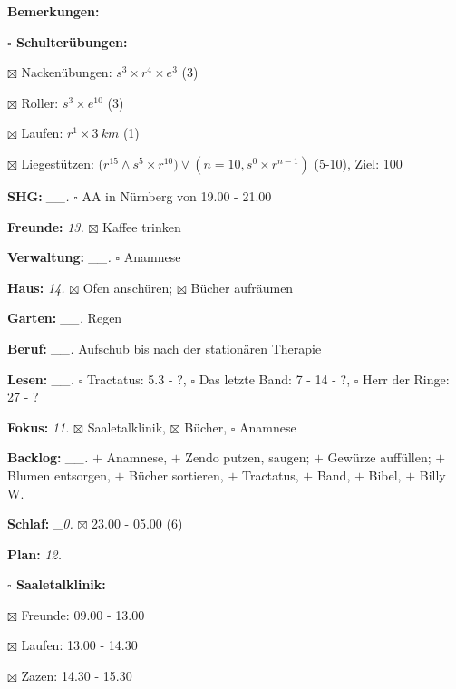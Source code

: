 \documentclass[10pt,a4paper]{article}
\newcommand\prop[1] {{\color {alizarin} {\bf #1}}}        %
\newcommand\mand[1] {{\color {burntorange} {\bf #1}}}     %
\newcommand\topspace{\vskip -15pt \hskip 20pt}
\newcommand\bottomspace{\vskip 4pt}
\newcommand\n[1] { {\sl #1.} \hskip 5pt }
\begin{document}
\begin{mdframed}[style=daystyle]
\begin{labeling}{{\mand {Bemerkungen:}}}
\begin{minipage}{0.75\textwidth}
\begin{labeling}{\prop {$\square$ {Schulterübungen:}}}
      \item[$\boxtimes$ Nackenübungen:]   $s^3 \times r^4 \times e^3$ (3)
      \item[$\boxtimes$ Roller:]          $s^3 \times e^{10}$ (3)
      \item[$\boxtimes$ Laufen:]          $r^1 \times 3\ km$ (1)
      \item[$\boxtimes$ Liegestützen:]    ($r^{15} \land s^5 \times r^{10}) \vee (n=10, s^0 \times r^{n-1})$ (5-10), Ziel: 100
      \end{labeling}
    \end{minipage}
    \bottomspace        
  \item[{\mand {SHG:}}]          \n{\_\_} $\square$ AA in Nürnberg von 19.00 - 21.00
  \item[{\mand {Freunde:}}]        \n{13} $\boxtimes$ Kaffee trinken
  \item[{\mand {Verwaltung:}}]   \n{\_\_} $\square$ Anamnese
  \item[{\mand {Haus:}}]           \n{14} $\boxtimes$ Ofen anschüren; $\boxtimes$ Bücher aufräumen
  \item[{\mand {Garten:}}]       \n{\_\_} Regen
  \item[{\mand {Beruf:}}]        \n{\_\_} Aufschub bis nach der stationären Therapie
  \item[{\mand {Lesen:}}]        \n{\_\_} $\square$ Tractatus: 5.3 - ?,
      $\square$ Das letzte Band: 7 - 14 - ?, $\square$ Herr der Ringe: 27 - ?
  \item[{\mand {Fokus:}}]          \n{11} $\boxtimes$ Saaletalklinik, $\boxtimes$ Bücher, $\square$ Anamnese
  \item[{\mand {Backlog:}}]      \n{\_\_} 
    $+$ Anamnese,
    $+$ Zendo putzen, saugen; $+$ Gewürze auffüllen; $+$ Blumen entsorgen, $+$ Bücher sortieren,
    $+$ Tractatus, $+$ Band, $+$ Bibel, $+$ Billy W.
  \item[{\mand {Schlaf:}}]        \n{\_0} $\boxtimes$ 23.00 - 05.00 (6)
  \item[{\mand {Plan:}}]           \n{12}
    \topspace
    \begin{minipage}{0.75\textwidth}  
      \begin{labeling}{\prop {$\square$ {Saaletalklinik:}}} 
        \setlength\itemsep{-3pt}
      \item[$\boxtimes$ Freunde:]        09.00 - 13.00
      \item[$\boxtimes$ Laufen:]         13.00 - 14.30
      \item[$\boxtimes$ Zazen:]          14.30 - 15.30        

\end{labeling}
\end{minipage}
\end{labeling}
\end{mdframed}
\end{document}
